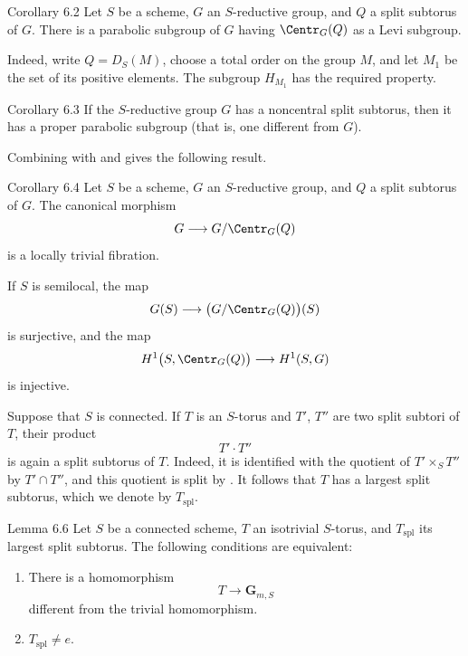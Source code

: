 \begin{sgastatement}{Corollary 6.2}
Let \(S\) be a scheme, \(G\) an \(S\)-reductive group, and \(Q\) a
split subtorus of \(G\).  There is a parabolic subgroup of \(G\)
having \(\Centr_G(Q)\) as a Levi subgroup.
\end{sgastatement}

Indeed, write \(Q=D_S(M)\), choose a total order on the group \(M\),
and let \(M_1\) be the set of its positive elements.  The subgroup
\(H_{M_1}\) has the required property.

\begin{sgastatement}{Corollary 6.3}
If the \(S\)-reductive group \(G\) has a noncentral split subtorus,
then it has a proper parabolic subgroup \textup{(that is, one
different from \(G\))}.
\end{sgastatement}

Combining  with  and  gives the following result.

\begin{sgastatement}{Corollary 6.4}
Let \(S\) be a scheme, \(G\) an \(S\)-reductive group, and \(Q\) a
split subtorus of \(G\).  The canonical morphism
\[
 G\longrightarrow G/\Centr_G(Q)
\]
is a locally trivial fibration.

If \(S\) is semilocal, the map
\[
 G(S)\longrightarrow\bigl(G/\Centr_G(Q)\bigr)(S)
\]
is surjective, and the map
\[
 H^1\bigl(S,\Centr_G(Q)\bigr)\longrightarrow H^1(S,G)
\]
is injective.
\end{sgastatement}


Suppose that \(S\) is connected.  If \(T\) is an \(S\)-torus and
\(T'\), \(T''\) are two split subtori of \(T\), their product
\[
 T'\cdot T''
\]
is again a split subtorus of \(T\).  Indeed, it is identified with the quotient of
\(T'\times_S T''\) by \(T'\cap T''\), and this quotient is split by
.  It follows that \(T\) has a largest split subtorus,
which we denote by \(T_{\mathrm{spl}}\).

\begin{sgastatement}{Lemma 6.6}
Let \(S\) be a connected scheme, \(T\) an isotrivial \(S\)-torus,
and \(T_{\mathrm{spl}}\) its largest split subtorus.  The following
conditions are equivalent:
\begin{enumerate}[label=\textup{(\roman*)}]
\item There is a homomorphism
\[
 T\longrightarrow\mathbf G_{m,S}
\]
different from the trivial homomorphism.
\item \(T_{\mathrm{spl}}\ne e\).
\end{enumerate}
\end{sgastatement}

